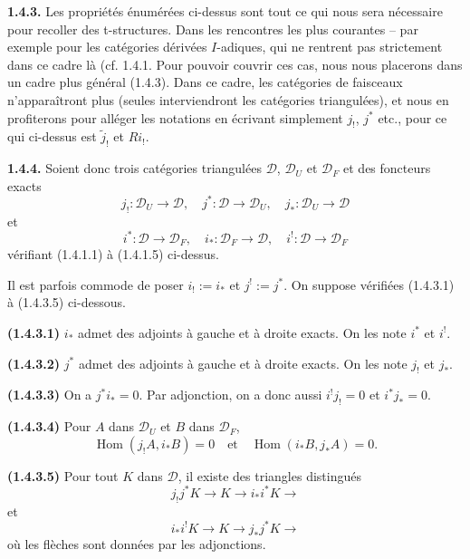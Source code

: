 \documentclass[12pt,a4paper]{article}
\theoremstyle{plain}
\theoremstyle{definition}
\theoremstyle{remark}
\DeclareMathOperator{\Hom}{Hom}
\newcommand{\cD}{\mathcal{D}}
\begin{document}
\smallskip

\noindent
\textbf{1.4.3.} Les propriétés énumérées ci-dessus sont tout ce qui nous sera nécessaire pour recoller des t-structures. Dans les rencontres les plus courantes -- par exemple pour les catégories dérivées $
I$-adiques, qui ne rentrent pas strictement dans ce cadre là (cf. 1.4.1. Pour pouvoir couvrir ces cas, nous nous placerons dans un cadre plus général (1.4.3). Dans ce cadre, les catégories de faisceaux n'apparaîtront plus (seules interviendront les catégories triangulées), et nous en profiterons pour alléger les notations en écrivant simplement $j_{!}$, $j^{*}$ etc., pour ce qui ci-dessus est $\tilde{j}_{!}$ et $Ri_{!}$.

\smallskip

\noindent
\textbf{1.4.4.} Soient donc trois catégories triangulées $\cD$, $\cD_{U}$ et $\cD_{F}$ et des foncteurs exacts
\[
j_{!} : \cD_{U} \to \cD, \quad j^{*} : \cD \to \cD_{U}, \quad j_{*} : \cD_{U} \to \cD
\]
et
\[
i^{*} : \cD \to \cD_{F}, \quad i_{*} : \cD_{F} \to \cD, \quad i^{!} : \cD \to \cD_{F}
\]
vérifiant (1.4.1.1) à (1.4.1.5) ci-dessus.

Il est parfois commode de poser $i_{!} := i_{*}$ et $j^{!} := j^{*}$. On suppose vérifiées (1.4.3.1) à (1.4.3.5) ci-dessous.

\smallskip

\noindent
\textbf{(1.4.3.1)} $i_{*}$ admet des adjoints à gauche et à droite exacts. On les note $i^{*}$ et $i^{!}$.

\smallskip

\noindent
\textbf{(1.4.3.2)} $j^{*}$ admet des adjoints à gauche et à droite exacts. On les note $j_{!}$ et $j_{*}$.

\smallskip

\noindent
\textbf{(1.4.3.3)} On a $j^{*}i_{*} = 0$. Par adjonction, on a donc aussi $i^{!}j_{!} = 0$ et $i^{*}j_{*} = 0$.

\smallskip

\noindent
\textbf{(1.4.3.4)} Pour $A$ dans $\cD_{U}$ et $B$ dans $\cD_{F}$,
\[
\Hom(j_{!}A, i_{*}B) = 0 \quad \text{et} \quad \Hom(i_{*}B, j_{*}A) = 0.
\]

\smallskip

\noindent
\textbf{(1.4.3.5)} Pour tout $K$ dans $\cD$, il existe des triangles distingués
\[
j_{!}j^{*}K \to K \to i_{*}i^{*}K \to
\]
et
\[
i_{*}i^{!}K \to K \to j_{*}j^{*}K \to
\]
où les flèches sont données par les adjonctions.

\smallskip
\end{document}
